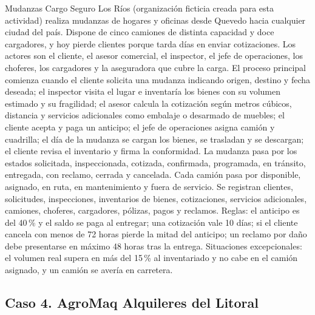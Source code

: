 \documentclass[11pt]{article}
\newcommand{\subseccion}[1]{\subsection{\textcolor{midblue}{#1}}}
\begin{document}
Mudanzas Cargo Seguro Los Ríos (organización ficticia creada para esta actividad) realiza mudanzas de hogares y oficinas desde Quevedo hacia cualquier ciudad del país. Dispone de cinco camiones de distinta capacidad y doce cargadores, y hoy pierde clientes porque tarda días en enviar cotizaciones. Los actores son el cliente, el asesor comercial, el inspector, el jefe de operaciones, los choferes, los cargadores y la aseguradora que cubre la carga. El proceso principal comienza cuando el cliente solicita una mudanza indicando origen, destino y fecha deseada; el inspector visita el lugar e inventaría los bienes con su volumen estimado y su fragilidad; el asesor calcula la cotización según metros cúbicos, distancia y servicios adicionales como embalaje o desarmado de muebles; el cliente acepta y paga un anticipo; el jefe de operaciones asigna camión y cuadrilla; el día de la mudanza se cargan los bienes, se trasladan y se descargan; el cliente revisa el inventario y firma la conformidad. La mudanza pasa por los estados solicitada, inspeccionada, cotizada, confirmada, programada, en tránsito, entregada, con reclamo, cerrada y cancelada. Cada camión pasa por disponible, asignado, en ruta, en mantenimiento y fuera de servicio. Se registran clientes, solicitudes, inspecciones, inventarios de bienes, cotizaciones, servicios adicionales, camiones, choferes, cargadores, pólizas, pagos y reclamos. Reglas: el anticipo es del 40\,\% y el saldo se paga al entregar; una cotización vale 10 días; si el cliente cancela con menos de 72 horas pierde la mitad del anticipo; un reclamo por daño debe presentarse en máximo 48 horas tras la entrega. Situaciones excepcionales: el volumen real supera en más del 15\,\% al inventariado y no cabe en el camión asignado, y un camión se avería en carretera.

\subseccion{Caso 4. AgroMaq Alquileres del Litoral}
\end{document}
